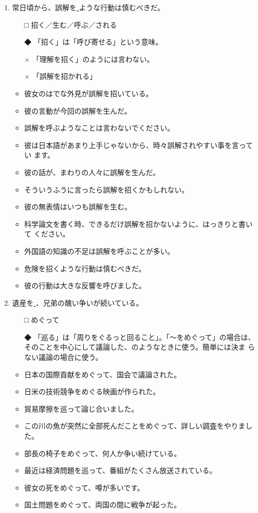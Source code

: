 \documentclass[
uplatex,
b5paper,
10pt,
dvipdfmx
]{jsbook}
\begin{document}
\begin{enumerate}
\item 常日頃から、誤解を\underline{   }ような行動は慎むべきだ。 
\begin{itemize}
\item[□] 招く／生む／呼ぶ／される
\item[◆] 「招く」は「呼び寄せる」という意味。
\item[×] 「理解を招く」のようには言わない。
\item[×] 「誤解を招かれる」
\end{itemize}
\begin{itemize}
\item 彼女のはでな外見が誤解を招いている。
\item 彼の言動が今回の誤解を生んだ。
\item 誤解を呼ぶようなことは言わないでください。
\item 彼は日本語があまり上手じゃないから、時々誤解されやすい事を言ってい
      ます。
\item 彼の話が、まわりの人々に誤解を生んだ。
\item そういうふうに言ったら誤解を招くかもしれない。
\item 彼の無表情はいつも誤解を生む。
\item 科学論文を書く時、できるだけ誤解を招かないように、はっきりと書いて
      ください。
\item 外国語の知識の不足は誤解を呼ぶことが多い。
\item 危険を招くような行動は慎むべきだ。
\item 彼の行動は大きな反響を呼びました。
\end{itemize}

\item 遺産を\underline{    }、兄弟の醜い争いが続いている。 
\begin{itemize}
\item[□] めぐって
\item[◆] 「巡る」は「周りをぐるっと回ること」。「〜をめぐって」の場合は、
	  そのことを中心にして議論した、のようなときに使う。簡単には決ま
	  らない議論の場合に使う。
\end{itemize}
\begin{itemize}
\item 日本の国際貢献をめぐって、国会で議論された。
\item 日米の技術競争をめぐる映画が作られた。 
\item 貿易摩擦を巡って論じ合いました。
\item この川の魚が突然に全部死んだことをめぐって、詳しい調査をやりました。
\item 部長の椅子をめぐって、何人か争い続けている。
\item 最近は経済問題を巡って、番組がたくさん放送されている。
\item 彼女の死をめぐって、噂が多いです。
\item 国土問題をめぐって、両国の間に戦争が起った。
\end{itemize}


\end{enumerate}
\end{document}
